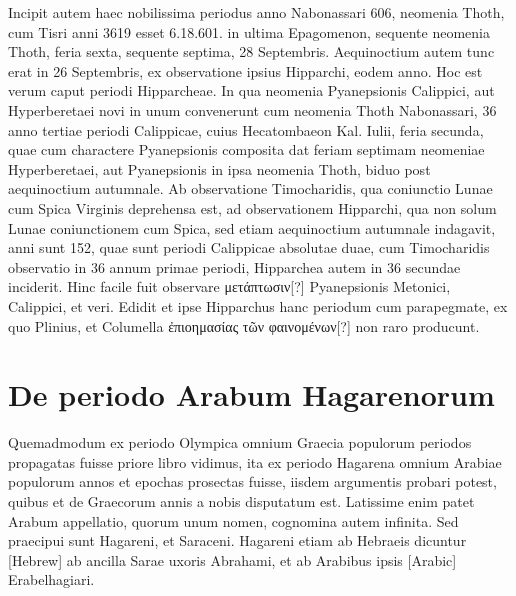 Incipit autem haec nobilissima periodus anno
Nabonassari 606, neomenia Thoth, cum Tisri anni 3619 esset 6.18.601.
in ultima Epagomenon, sequente neomenia Thoth, feria sexta,
sequente septima, 28 Septembris.
Aequinoctium autem tunc erat in 26
Septembris, ex observatione ipsius Hipparchi, eodem anno.
Hoc est
verum caput periodi Hipparcheae.
In qua neomenia Pyanepsionis
Calippici, aut Hyperberetaei novi in unum convenerunt cum neomenia
Thoth Nabonassari, 36 anno tertiae periodi Calippicae, cuius Hecatombaeon
Kal. %
Iulii, feria secunda, quae cum charactere Pyanepsionis
composita dat feriam septimam neomeniae Hyperberetaei, aut Pyanepsionis
in ipsa neomenia Thoth, biduo post aequinoctium autumnale.
Ab observatione Timocharidis, qua coniunctio Lunae cum Spica
Virginis deprehensa est, ad observationem Hipparchi, qua non solum
Lunae coniunctionem cum Spica, sed etiam aequinoctium autumnale
indagavit, anni sunt 152, quae sunt periodi Calippicae absolutae
duae, cum Timocharidis observatio in 36 annum primae periodi,
Hipparchea autem in 36 secundae inciderit.
Hinc facile fuit observare
\textgreek{μετάπτωσιν[?]} Pyanepsionis Metonici, Calippici, et veri.
Edidit et
ipse Hipparchus hanc periodum cum parapegmate, ex quo Plinius,
et Columella \textgreek{ἐπιοημασίας τῶν φαινομένων[?]} non raro producunt.

\section{De periodo Arabum Hagarenorum}
\begin{table}[htbp]
  
\end{table}

Quemadmodum
ex periodo Olympica
omnium Graecia
populorum periodos
propagatas fuisse priore libro
vidimus, ita ex periodo
Hagarena omnium
Arabiae populorum annos
et epochas prosectas
fuisse, iisdem argumentis
probari potest, quibus et
de Graecorum annis a nobis
disputatum est. Latissime
enim patet Arabum
appellatio, quorum unum
nomen, cognomina autem
infinita.
Sed praecipui
sunt Hagareni, et Saraceni.
Hagareni etiam ab
Hebraeis dicuntur \texthebrew{[Hebrew]} ab ancilla Sarae uxoris Abrahami,
 et ab Arabibus
ipsis \textarabic{[Arabic]} Erabelhagiari.

